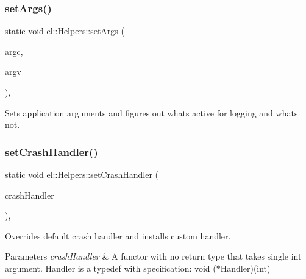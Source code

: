 \subsubsection{\texorpdfstring{set\+Args()}{setArgs()}}
{\footnotesize\ttfamily static void el\+::\+Helpers\+::set\+Args (\begin{DoxyParamCaption}\item[{int}]{argc,  }\item[{const char $\ast$$\ast$}]{argv }\end{DoxyParamCaption})\hspace{0.3cm}{\ttfamily [inline]}, {\ttfamily [static]}}



Sets application arguments and figures out whats active for logging and whats not. 

\mbox{\label{classel_1_1_helpers_a4155f6fff0074ad93aa56fd7fe064097}} 
\subsubsection{\texorpdfstring{set\+Crash\+Handler()}{setCrashHandler()}}
{\footnotesize\ttfamily static void el\+::\+Helpers\+::set\+Crash\+Handler (\begin{DoxyParamCaption}\item[{const el\+::base\+::debug\+::\+Crash\+Handler\+::\+Handler \&}]{crash\+Handler }\end{DoxyParamCaption})\hspace{0.3cm}{\ttfamily [inline]}, {\ttfamily [static]}}



Overrides default crash handler and installs custom handler. 


\begin{DoxyParams}{Parameters}
{\em crash\+Handler} & A functor with no return type that takes single int argument. Handler is a typedef with specification\+: void ($\ast$\+Handler)(int) \\
\hline
\end{DoxyParams}
\mbox{\label{classel_1_1_helpers_a13a5365de36b3af27660cf9b358829d3}} 
